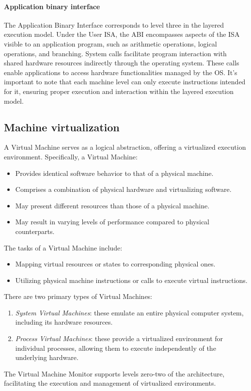 \paragraph*{Application binary interface}
The Application Binary Interface corresponds to level three in the layered execution model.
Under the User ISA, the ABI encompasses aspects of the ISA visible to an application program, such as arithmetic operations, logical operations, and branching.
System calls facilitate program interaction with shared hardware resources indirectly through the operating system. 
These calls enable applications to access hardware functionalities managed by the OS.
It's important to note that each machine level can only execute instructions intended for it, ensuring proper execution and interaction within the layered execution model.

\subsection{Machine virtualization}
A Virtual Machine serves as a logical abstraction, offering a virtualized execution environment. 
Specifically, a Virtual Machine:
\begin{itemize}
    \item Provides identical software behavior to that of a physical machine.
    \item Comprises a combination of physical hardware and virtualizing software.
    \item May present different resources than those of a physical machine.
    \item May result in varying levels of performance compared to physical counterparts.
\end{itemize}
The tasks of a Virtual Machine include:
\begin{itemize}
    \item Mapping virtual resources or states to corresponding physical ones.
    \item Utilizing physical machine instructions or calls to execute virtual instructions.
\end{itemize}
There are two primary types of Virtual Machines:
\begin{enumerate}
    \item \textit{System Virtual Machines}: these emulate an entire physical computer system, including its hardware resources.
    \item \textit{Process Virtual Machines}: these provide a virtualized environment for individual processes, allowing them to execute independently of the underlying hardware.
\end{enumerate}
The Virtual Machine Monitor supports levels zero-two of the architecture, facilitating the execution and management of virtualized environments.

